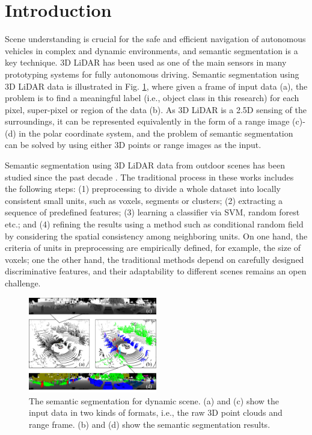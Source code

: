 	\section{Introduction}
	Scene understanding is crucial for the safe and efficient navigation of autonomous vehicles in complex and dynamic environments, and semantic segmentation is a key technique. 3D LiDAR has been used as one of the main sensors in many prototyping systems for fully autonomous driving\cite{urmson2008autonomous}. Semantic segmentation using 3D LiDAR data is illustrated in Fig. \ref{fig:dynamiccampus}, where given a frame of input data (a), the problem is to find a meaningful label (i.e., object class in this research) for each pixel, super-pixel or region of the data (b). As 3D LiDAR is a 2.5D sensing of the surroundings, it can be represented equivalently in the form of a range image (c)-(d) in the polar coordinate system, and the problem of semantic segmentation can be solved by using either 3D points or range images as the input.
	
	Semantic segmentation using 3D LiDAR data from outdoor scenes has been studied since the past decade \cite{urmson2008autonomous,moosmann2009segmentation,douillard2011segmentation}. The traditional process in these works \cite{munoz2009onboard,zhao2010scene} includes the following steps: (1) preprocessing to divide a whole dataset into locally consistent small units, such as voxels, segments or clusters; (2) extracting a sequence of predefined features; (3) learning a classifier via SVM, random forest etc.; and (4) refining the results using a method such as conditional random field by considering the spatial consistency among neighboring units. On one hand, the criteria of units in preprocessing are empirically defined, for example, the size of voxels\cite{hackel2017isprs}; one the other hand, the traditional methods depend on carefully designed discriminative features, and their adaptability to different scenes remains an open challenge.
	
	\begin{figure}
		\centering
		\includegraphics[width=0.5\textwidth]{fig/Fig1.png}
		\caption{The semantic segmentation for dynamic scene. (a) and (c) show the input data in two kinds of formats, i.e., the raw 3D point clouds and range frame. (b) and (d) show the semantic segmentation results.}
		\label{fig:dynamiccampus}
	\end{figure}	
	
